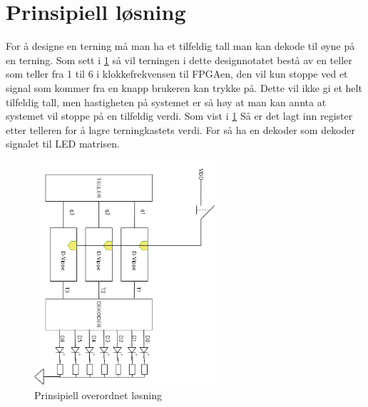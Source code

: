 \section{Prinsipiell løsning}
\label{prinsipiellLoesning}


For å designe en terning må man ha et tilfeldig tall man kan dekode til øyne på en terning. Som sett i \ref{fig:Fig1} så vil terningen i dette designnotatet bestå av en teller som teller fra 1 til 6 i klokkefrekvensen til FPGAen, den vil kun stoppe ved et signal som kommer fra en knapp brukeren kan trykke på. Dette vil ikke gi et helt tilfeldig tall, men hastigheten på systemet er så høy at man kan annta at systemet vil stoppe på en tilfeldig verdi. Som vist i \ref{fig:Fig1} Så er det lagt inn register etter telleren for å lagre terningkastets verdi. For så ha en dekoder som dekoder signalet til LED matrisen. 

\begin{figure}[htbp]
  \centering
  \includegraphics[width=0.6\textwidth,angle = 90]{Bilder/overordnet.png} 
  \caption{Prinsipiell overordnet løsning}
  \label{fig:Fig1}
\end{figure}
